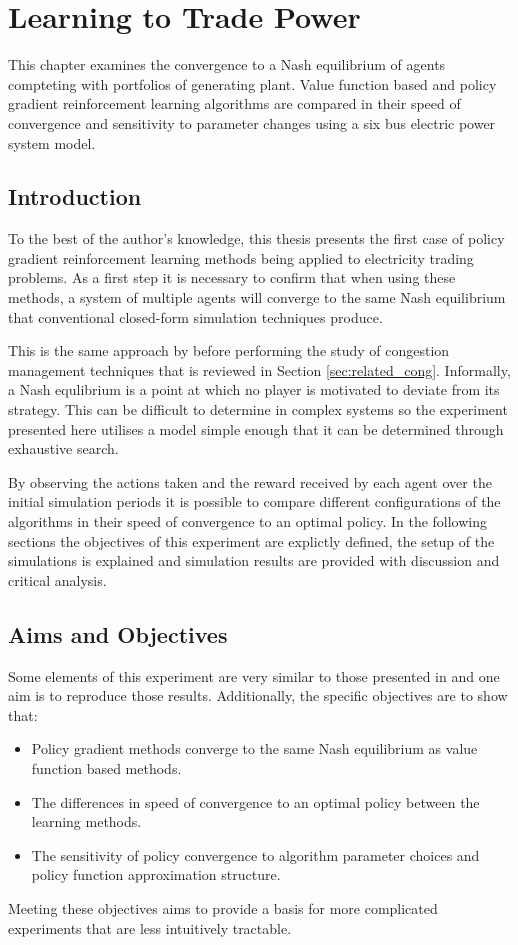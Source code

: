 \chapter{Learning to Trade Power}
\label{ch:learningtotrade}
This chapter examines the convergence to a Nash equilibrium of agents
compteting with portfolios of generating plant.  Value function based and
policy gradient reinforcement learning algorithms are compared in their speed
of convergence and sensitivity to parameter changes using a six bus electric
power system model.

\section{Introduction}
To the best of the author's knowledge, this thesis presents the first case of
policy gradient reinforcement learning methods being applied to electricity
trading problems.  As a first step it is necessary to confirm that when using
these methods, a system of multiple agents will converge to the same Nash
equilibrium that conventional closed-form simulation techniques produce.

This is the same approach by  before performing the study
of congestion management techniques that is reviewed in Section
\ref{sec:related_cong}.  Informally, a Nash equlibrium is a point at which no
player is motivated to deviate from its strategy.  This can be difficult
to determine in complex systems so the experiment presented here utilises a
model simple enough that it can be determined through exhaustive search.

By observing the actions taken and the reward received by each agent over the
initial simulation periods it is possible to compare different configurations
of the algorithms in their speed of convergence to an optimal policy.  In the
following sections the objectives of this experiment are explictly defined, the
setup of the simulations is explained and simulation results are provided with
discussion and critical analysis.

\section{Aims and Objectives}
Some elements of this experiment are very similar to those presented in
 and one aim is to reproduce those results.  Additionally,
the specific objectives are to show that:
\begin{itemize}
  \item Policy gradient methods converge to the same Nash equilibrium as value
  function based methods.
  \item The differences in speed of convergence to an optimal policy between
  the learning methods.
  \item The sensitivity of policy convergence to algorithm parameter choices
  and policy function approximation structure.
\end{itemize}
Meeting these objectives aims to provide a basis for more complicated
experiments that are less intuitively tractable.

